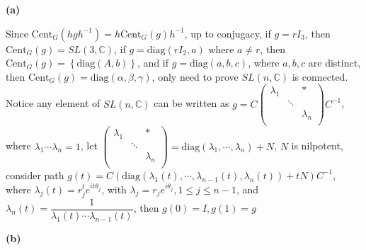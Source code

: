 \documentclass[main]{subfiles}
\newcommand{\<}[1]{\langle #1 \rangle}
\begin{document}
\textbf{(a)} \par
Since $\mathrm{Cent}_G(hgh^{-1})=h\mathrm{Cent}_G(g)h^{-1}$, up to conjugacy, if $g=rI_3$, then $\mathrm{Cent}_G(g)=SL(3,\mathbb C)$, if $g=\mathrm{diag}(rI_2,a)$ where $a\neq r$, then $\mathrm{Cent}_G(g)=\left\{\mathrm{diag}(A,b)\right\}$, and if $g=\mathrm{diag}(a,b,c)$, where $a,b,c$ are distinct, then $\mathrm{Cent}_G(g)=\mathrm{diag}(\alpha, \beta, \gamma)$, only need to prove $SL(n,\mathbb C)$ is connected. Notice any element of $SL(n,\mathbb C)$ can be written as $g=C\left( {\begin{array}{ccc}
\lambda_1 &  & * \\
& \ddots &  \\
 & & \lambda_n\\
\end{array} } \right)C^{-1}$, where $\lambda_1\cdots\lambda_n=1$, let $\left( {\begin{array}{ccc}
\lambda_1 &  & * \\
& \ddots &  \\
 & & \lambda_n\\
\end{array} } \right)=\mathrm{diag}(\lambda_1,\cdots,\lambda_n)+N$, $N$ is nilpotent, consider path $g(t)=C\left(\mathrm{diag}(\lambda_1(t),\cdots,\lambda_{n-1}(t),\lambda_n(t))+tN\right)C^{-1}$, where $\lambda_j(t)=r_j^te^{it\theta_j}$, with $\lambda_j=r_je^{i\theta_j}, 1\leq j\leq n-1$, and $\lambda_n(t)=\dfrac{1}{\lambda_1(t)\cdots\lambda_{n-1}(t)}$, then $g(0)=I, g(1)=g$ \par
\textbf{(b)} \par
\end{document}
